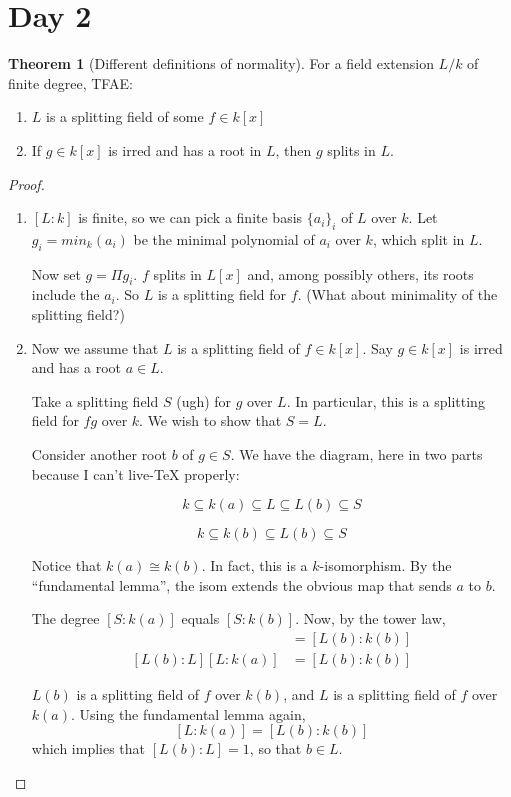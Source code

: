 \documentclass{article}
\theoremstyle{definition}
\newtheorem*{thm}{Theorem}
\begin{document}
\section{Day 2}
\begin{thm}[Different definitions of normality]
  For a field extension $L/k$ of finite degree, TFAE:
  \begin{enumerate}
  \item $L$ is a splitting field of some $f\in k[x]$
  \item If $g\in k[x]$ is irred and has a root in $L$, then $g$ splits in $L$. 
  \end{enumerate}
\end{thm}
\begin{proof}
  \begin{enumerate}
  \item $[L:k]$ is finite, so we can pick a finite basis $\{a_i\}_i$ of $L$ over
    $k$. Let $g_i = min_k(a_i)$ be the minimal polynomial of $a_i$ over $k$,
    which split in $L$.

    Now set $g = \Pi g_i$. $f$ splits in $L[x]$ and, among possibly others, its
    roots include the $a_i$. So $L$ is a splitting field for $f$. (What about
    minimality of the splitting field?)
    
  \item Now we assume that $L$ is a splitting field of $f\in k[x]$. Say $g\in
    k[x]$ is irred and has a root $a\in L$.

    Take a splitting field $S$ (ugh) for $g$ over $L$. In particular, this is a
    splitting field for $fg$ over $k$. We wish to show that $S = L$.

    Consider another root $b$ of $g\in S$. We have the diagram, here in two
    parts because I can't live-TeX properly:

    $$ k \subseteq k(a) \subseteq L \subseteq L(b) \subseteq S$$

    $$ k \subseteq k(b) \subseteq L(b) \subseteq S $$

    Notice that $k(a) \cong k(b)$. In fact, this is a $k$-isomorphism. By the
    ``fundamental lemma'', the isom extends the obvious map that sends $a$ to $b$.

    The degree $[S:k(a)]$ equals $[S:k(b)]$. Now, by the tower law,
    \begin{align*}
      [L(b):k(a)] &= [L(b):k(b)] \\
      [L(b):L][L:k(a)] &= [L(b):k(b)]
    \end{align*}

    $L(b)$ is a splitting field of $f$ over $k(b)$, and $L$ is a splitting field
    of $f$ over $k(a)$. Using the fundamental lemma again,
    $$[L:k(a)] = [L(b):k(b)]$$
    which implies that $[L(b):L]=1$, so that $b \in L$.
  \end{enumerate}
\end{proof}
\end{document}
